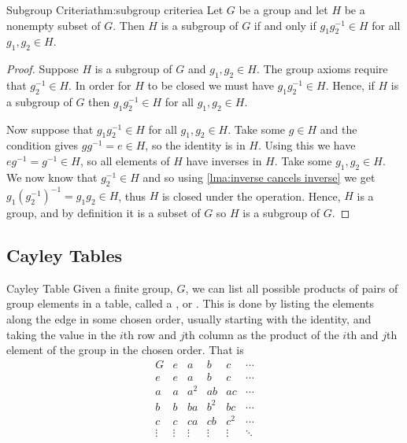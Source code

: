\begin{thm}{Subgroup Criteria}{thm:subgroup criteriea}
    Let \(G\) be a group and let \(H\) be a nonempty subset of \(G\).
    Then \(H\) is a subgroup of \(G\) if and only if \(g_1g_2^{-1} \in H\) for all \(g_1, g_2 \in H\).
    
    \begin{proof}
        Suppose \(H\) is a subgroup of \(G\) and \(g_1, g_2 \in H\).
        The group axioms require that \(g_2^{-1} \in H\).
        In order for \(H\) to be closed we must have \(g_1g_2^{-1} \in H\).
        Hence, if \(H\) is a subgroup of \(G\) then \(g_1g_2^{-1} \in H\) for all \(g_1, g_2 \in H\).
        
        Now suppose that \(g_1g_2^{-1} \in H\) for all \(g_1, g_2 \in H\).
        Take some \(g \in H\) and the condition gives \(gg^{-1} = e \in H\), so the identity is in \(H\).
        Using this we have \(eg^{-1} = g^{-1} \in H\), so all elements of \(H\) have inverses in \(H\).
        Take some \(g_1, g_2 \in H\).
        We now know that \(g_2^{-1} \in H\) and so using \cref{lma:inverse cancels inverse} we get \(g_1(g_2^{-1})^{-1} = g_1g_2 \in H\), thus \(H\) is closed under the operation.
        Hence, \(H\) is a group, and by definition it is a subset of \(G\) so \(H\) is a subgroup of \(G\).
    \end{proof}
\end{thm}

\subsection{Cayley Tables}
\begin{dfn}{Cayley Table}{}
    Given a finite group, \(G\), we can list all possible products of pairs of group elements in a table, called a , or .
    This is done by listing the elements along the edge in some chosen order, usually starting with the identity, and taking the value in the \(i\)th row and \(j\)th column as the product of the \(i\)th and \(j\)th element of the group in the chosen order.
    That is
    \begin{equation}
        \begin{array}{c|ccccc}
            G & e & a & b & c & \cdots \\\hline
            e & e & a & b & c & \cdots \\
            a & a & a^2 & ab & ac & \cdots \\
            b & b & ba & b^2 & bc & \cdots \\
            c & c & ca & cb & c^2 & \cdots \\
            \vdots & \vdots &  \vdots & \vdots & \vdots & \ddots
        \end{array}
    \end{equation}
\end{dfn}

